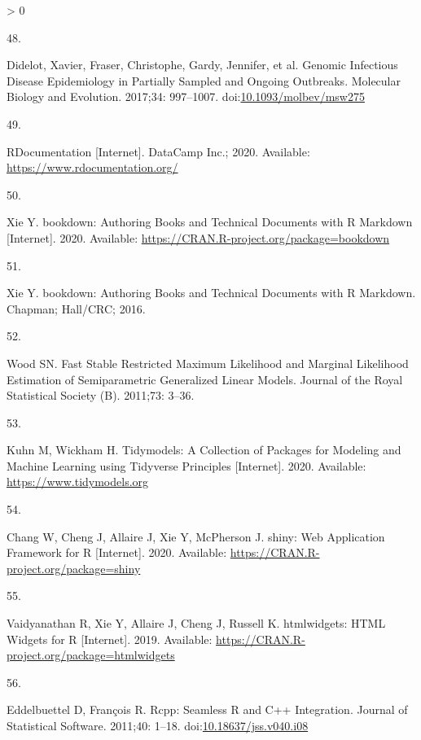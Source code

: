 \documentclass[10pt,letterpaper]{article}
\newlength{\csllabelwidth}
\newlength{\cslhangindent}
\newenvironment{CSLReferences}[3] %
 {%
  \setlength{\parindent}{0pt}
  \ifodd #1 \everypar{\setlength{\hangindent}{\cslhangindent}}\ignorespaces\fi
  \ifnum #2 > 0
  \setlength{\parskip}{#2\baselineskip}
  \fi
 }%
 {}
\newcommand{\CSLLeftMargin}[1]{\parbox[t]{\csllabelwidth}{#1}}
\newcommand{\CSLRightInline}[1]{\parbox[t]{\linewidth - \csllabelwidth}{#1}}
\begin{document}
\begin{CSLReferences}{0}{0}
\leavevmode\hypertarget{ref-TransPhylo}{}%
\CSLLeftMargin{48. }
\CSLRightInline{Didelot, Xavier, Fraser, Christophe, Gardy, Jennifer, et
al. {Genomic Infectious Disease Epidemiology in Partially Sampled and
Ongoing Outbreaks}. Molecular Biology and Evolution. 2017;34: 997--1007.
doi:\href{https://doi.org/10.1093/molbev/msw275}{10.1093/molbev/msw275}}

\leavevmode\hypertarget{ref-rdocumentation}{}%
\CSLLeftMargin{49. }
\CSLRightInline{{RDocumentation} {[}Internet{]}. DataCamp Inc.; 2020.
Available: \url{https://www.rdocumentation.org/}}

\leavevmode\hypertarget{ref-bookdown}{}%
\CSLLeftMargin{50. }
\CSLRightInline{Xie Y. {bookdown: Authoring Books and Technical
Documents with R Markdown} {[}Internet{]}. 2020. Available:
\url{https://CRAN.R-project.org/package=bookdown}}

\leavevmode\hypertarget{ref-xie2016}{}%
\CSLLeftMargin{51. }
\CSLRightInline{Xie Y. {bookdown: Authoring Books and Technical
Documents with R Markdown}. Chapman; Hall/CRC; 2016. }

\leavevmode\hypertarget{ref-mgcv}{}%
\CSLLeftMargin{52. }
\CSLRightInline{Wood SN. {Fast Stable Restricted Maximum Likelihood and
Marginal Likelihood Estimation of Semiparametric Generalized Linear
Models}. Journal of the Royal Statistical Society (B). 2011;73: 3--36. }

\leavevmode\hypertarget{ref-tidymodels}{}%
\CSLLeftMargin{53. }
\CSLRightInline{Kuhn M, Wickham H. {Tidymodels: A Collection of Packages
for Modeling and Machine Learning using Tidyverse Principles}
{[}Internet{]}. 2020. Available: \url{https://www.tidymodels.org}}

\leavevmode\hypertarget{ref-shiny}{}%
\CSLLeftMargin{54. }
\CSLRightInline{Chang W, Cheng J, Allaire J, Xie Y, McPherson J. {shiny:
Web Application Framework for R} {[}Internet{]}. 2020. Available:
\url{https://CRAN.R-project.org/package=shiny}}

\leavevmode\hypertarget{ref-htmlwidgets}{}%
\CSLLeftMargin{55. }
\CSLRightInline{Vaidyanathan R, Xie Y, Allaire J, Cheng J, Russell K.
{htmlwidgets: HTML Widgets for R} {[}Internet{]}. 2019. Available:
\url{https://CRAN.R-project.org/package=htmlwidgets}}

\leavevmode\hypertarget{ref-Rcpp}{}%
\CSLLeftMargin{56. }
\CSLRightInline{Eddelbuettel D, François R. {Rcpp: Seamless R and C++
Integration}. Journal of Statistical Software. 2011;40: 1--18.
doi:\href{https://doi.org/10.18637/jss.v040.i08}{10.18637/jss.v040.i08}}


\end{CSLReferences}
\end{document}
